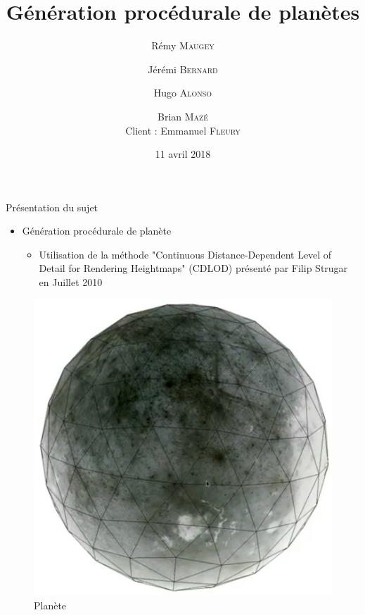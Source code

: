 \documentclass[french]{beamer}
\title{Génération procédurale de planètes}
\author{  \vspace{1.5cm}Rémy \textsc{Maugey} \and
  Jérémi \textsc{Bernard} \and
  Hugo \textsc{Alonso} \and
  Brian \textsc{Mazé}\\
  \vspace{2.5cm}
  Client : Emmanuel \textsc{Fleury}}
\date{11 avril 2018}
\begin{document}
\begin{frame}
  \titlepage
\end{frame}

\begin{frame}{Présentation du sujet}

  
    \begin{itemize}
  \item
    Génération procédurale de planète
    \begin{itemize}
    \item
      Utilisation de la méthode \alert{"Continuous Distance-Dependent Level of Detail for Rendering Heightmaps"} (CDLOD) présenté par Filip Strugar en Juillet 2010\protect\footnotemark
    \end{itemize}
  \end{itemize}
  
  \begin{figure}
   \includegraphics[scale=0.20]{img/planet_intro.png}
   \caption{Planète}
\end{figure}
  
    
\end{frame}
\end{document}
